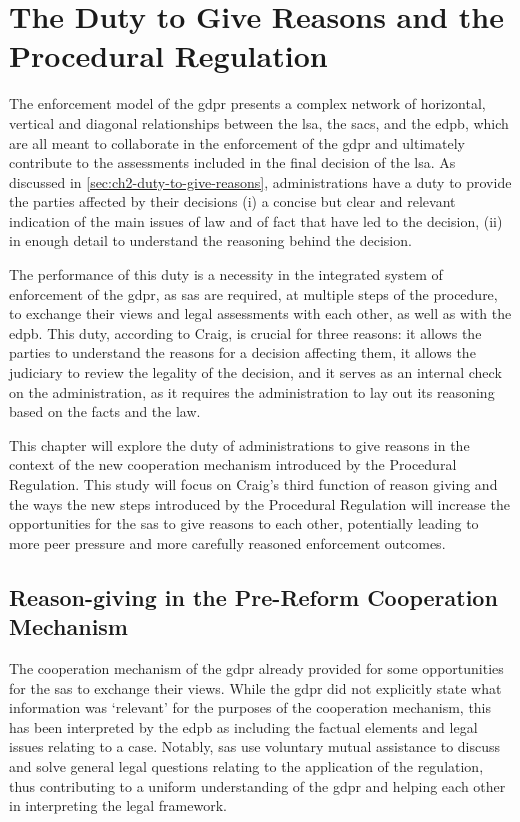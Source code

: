 \section{The Duty to Give Reasons and the Procedural Regulation}
\label{sec:ch5-duty-to-give-reasons-procedural-regulation}

The enforcement model of the \gls{gdpr} presents a complex network of horizontal, vertical and diagonal relationships between the \gls{lsa}, the \glspl{sac}, and the \gls{edpb},\autocite[461]{hofmannmustertScholtenHandbook2023} which are all meant to collaborate in the enforcement of the \gls{gdpr} and ultimately contribute to the assessments included in the final decision of the \gls{lsa}.
As discussed in \cref{sec:ch2-duty-to-give-reasons}, administrations have a duty to provide the parties affected by their decisions (i) a concise but
clear and relevant indication of the main issues of law and of fact that have led to the decision, (ii) in enough detail to understand the reasoning behind the decision.

The performance of this duty is a necessity in the integrated system of enforcement of the \gls{gdpr}, as \glspl{sa} are required, at multiple steps of the procedure, to exchange their views and legal assessments with each other, as well as with the \gls{edpb}.
This duty, according to Craig, is crucial for three reasons: it allows the parties to understand the reasons for a decision affecting them, it allows the judiciary to review the legality of the decision, and it serves as an internal check on the administration, as it requires the administration to lay out its reasoning based on the facts and the law.\autocite[369--370]{craigProcess2018}

This chapter will explore the duty of administrations to give reasons in the context of the new cooperation mechanism introduced by the Procedural Regulation. 
This study will focus on Craig's third function of reason giving and the ways the new steps introduced by the Procedural Regulation will increase the opportunities for the \glspl{sa} to give reasons to each other, potentially leading to more peer pressure and more carefully reasoned enforcement outcomes.

\subsection{Reason-giving in the Pre-Reform Cooperation Mechanism}
\label{sec:ch5-pre-reform-reason-giving}

The cooperation mechanism of the \gls{gdpr} already provided for some opportunities for the \glspl{sa} to exchange their views.
While the \gls{gdpr} did not explicitly state what information was `relevant' for the purposes of the cooperation mechanism, this has been interpreted by the \gls{edpb} as including the factual elements and legal issues relating to a case.\autocite[46]{edpbGuidelines022022}
Notably, \glspl{sa} use voluntary mutual assistance to discuss and solve general legal questions relating to the application of the regulation, thus contributing to a uniform understanding of the \gls{gdpr} and helping each other in interpreting the legal framework.\autocite[4.1.2]{edpbContributionGDPREvaluation2023}

